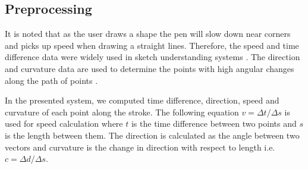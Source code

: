 \documentclass[a4paper,10pt]{IEEEconf}
\begin{document}
\subsection{Preprocessing}
\label{Prepross}
 It is noted that as the user draws a shape the pen will slow down near corners and picks up speed when drawing a straight lines. Therefore, the speed and time difference data were widely used in sketch understanding systems \cite{earlyprocess}.  The direction and curvature data are used to determine the points with high angular changes along the path of points \cite{meanshift10}.  
 
 In the presented system, we computed time difference, direction, speed and curvature of each point along the stroke. The following equation $v=\Delta t/\Delta s$ is used for speed calculation  where $t$ is the time difference between two points and $s$ is the length between them. The direction is calculated as the angle between two vectors and curvature is the change in direction with respect to length i.e. $c= \Delta d/\Delta s$.
 
\end{document}
